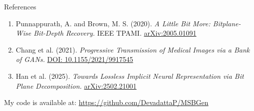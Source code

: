 \documentclass[aspectratio=169, 11pt]{beamer}
\begin{document}
\begin{frame}{References}
    \small
    \begin{enumerate}
        \item Punnappurath, A. and Brown, M. S. (2020). \textit{A Little Bit More: Bitplane-Wise Bit-Depth Recovery.} IEEE TPAMI. \href{https://arxiv.org/abs/2005.01091}{arXiv:2005.01091}\label{ref:bitdepth2020}
        
        \vspace{0.2cm}
        \item Chang et al. (2021). \textit{Progressive Transmission of Medical Images via a Bank of GANs.} \href{https://doi.org/10.1155/2021/9917545}{DOI: 10.1155/2021/9917545}\label{chang2021}

        \vspace{0.2cm}
        \item Han et al. (2025). \textit{Towards Lossless Implicit Neural Representation via Bit Plane Decomposition.} \href{https://doi.org/10.48550/arXiv.2502.21001}{arXiv:2502.21001}\label{han2025}

    \end{enumerate}
    \vfill
    My code is available at: \url{https://github.com/DevadattaP/MSBGen}
\end{frame}
\end{document}
